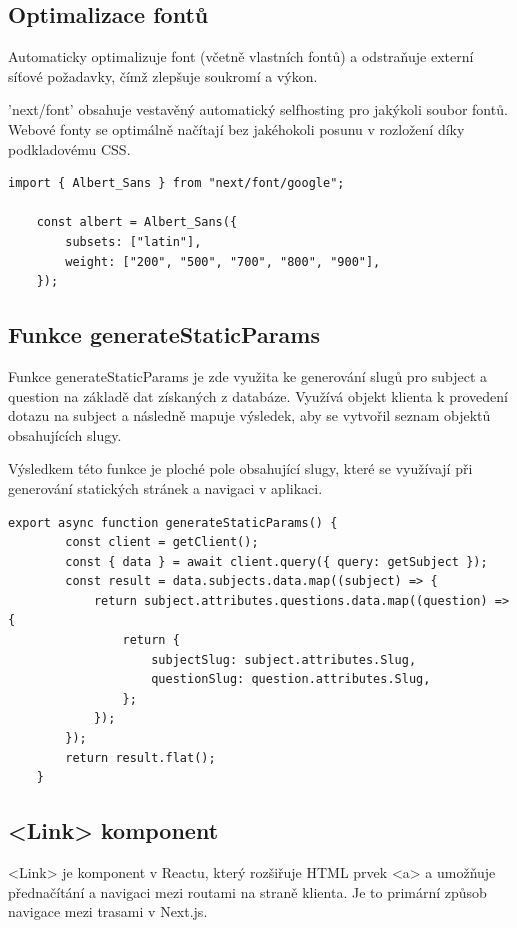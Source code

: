 \documentclass[12pt, a4paper,
oneside,      %
openright
]{report}
\begin{document}
\subsection{Optimalizace fontů}
Automaticky optimalizuje font (včetně vlastních fontů) a odstraňuje externí síťové požadavky, čímž zlepšuje soukromí a výkon.

'next/font' obsahuje vestavěný automatický selfhosting pro jakýkoli soubor fontů. Webové fonty se optimálně načítají bez jakéhokoli posunu v rozložení díky podkladovému CSS.

\vspace{10pt}

\begin{lstlisting}[style=JavaScript, title={Kód}, caption={Ukázka layout.js}]
	import { Albert_Sans } from "next/font/google";
	
	const albert = Albert_Sans({
		subsets: ["latin"],
		weight: ["200", "500", "700", "800", "900"],
	});
\end{lstlisting}	

\subsection{Funkce generateStaticParams}
Funkce generateStaticParams je zde využita ke generování slugů pro subject a question na základě dat získaných z databáze. Využívá objekt klienta k provedení dotazu na subject a následně mapuje výsledek, aby se vytvořil seznam objektů obsahujících slugy. 

Výsledkem této funkce je ploché pole obsahující slugy, které se využívají při generování statických stránek a navigaci v aplikaci.

\vspace{10pt}

\begin{lstlisting}[style=JavaScript, title={Kód}, caption={Ukázka funkce generateStaticParams v page.js}]
	export async function generateStaticParams() {
		const client = getClient();
		const { data } = await client.query({ query: getSubject });
		const result = data.subjects.data.map((subject) => {
			return subject.attributes.questions.data.map((question) => {
				return {
					subjectSlug: subject.attributes.Slug,
					questionSlug: question.attributes.Slug,
				};
			});
		});
		return result.flat();
	}
\end{lstlisting}	

\subsection{<Link> komponent}
<Link> je komponent v Reactu, který rozšiřuje HTML prvek <a> a umožňuje přednačítání a navigaci mezi routami na straně klienta. Je to primární způsob navigace mezi trasami v Next.js.
\end{document}
